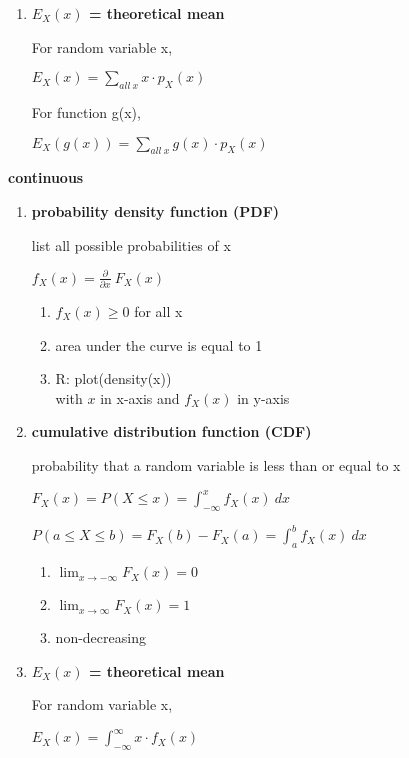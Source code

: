 \documentclass{article}
\begin{document}
\begin{small}
\begin{multicols}{2}
\begin{enumerate}
\item\textbf{$E_X(x)$ = theoretical mean}

For random variable x, 

$E_X(x) = \sum_{all \ x} x \cdot p_X(x)$

For function g(x), 

$E_X(g(x)) = \sum_{all \ x} g(x) \cdot p_X(x)$

\end{enumerate}

\columnbreak
\textbf{continuous}
\begin{enumerate}
\item\textbf{probability density function (PDF)}

list all possible probabilities of x

$f_X(x) = \frac{\partial}{\partial x} \ F_X(x)$

  \begin{enumerate}
  \item $f_X(x) \ge 0$ for all x
  \item area under the curve is equal to 1
  \item R: plot(density(x)) \\ with $x$ in x-axis and $f_X(x)$ in y-axis
  \end{enumerate}

\item\textbf{cumulative distribution function (CDF)}

probability that a random variable is less than or equal to x

$F_X(x) = P(X \leq x) = \int_{-\infty}^{x} f_X(x) \ dx$ 

$P(a \le X \le b) = F_X(b) - F_X(a) = \int_{a}^{b} f_X(x) \ dx$

  \begin{enumerate}
  \item $\lim_{x\to-\infty} F_X(x) = 0$
  \item $\lim_{x\to\infty} F_X(x) = 1$
  \item non-decreasing
  \end{enumerate}

\item\textbf{$E_X(x)$ = theoretical mean}

For random variable x, 

$E_X(x) = \int_{-\infty}^{\infty} x \cdot f_X(x)$


\end{enumerate}
\end{multicols}
\end{small}
\end{document}
